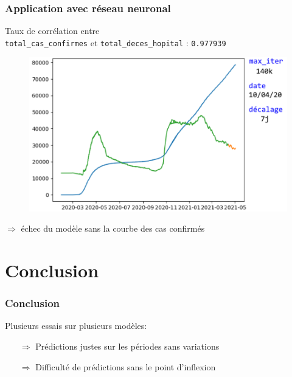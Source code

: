 \documentclass{beamer}[aspectratio = 43]
\begin{document}
\begin{frame}
	\frametitle{Application avec réseau neuronal}
	Taux de corrélation entre\\ \texttt{total\_cas\_confirmes} et \texttt{total\_deces\_hopital} : \texttt{0.977939} 
	\begin{figure}
		\includegraphics[scale=0.4]{NN_up_}
	\end{figure}
	$\Rightarrow$ échec du modèle sans la courbe des cas confirmés
\end{frame}

\section{Conclusion}
\begin{frame}
	\frametitle{Conclusion}
	
	Plusieurs essais sur plusieurs modèles: 
	\begin{itemize}
		\item[$\Rightarrow$] Prédictions justes sur les périodes sans variations
		\onslide<3>
		\item[$\Rightarrow$] Difficulté de prédictions sans le point d'inflexion
	\end{itemize}
	
\end{frame}

\appendix
\end{document}
